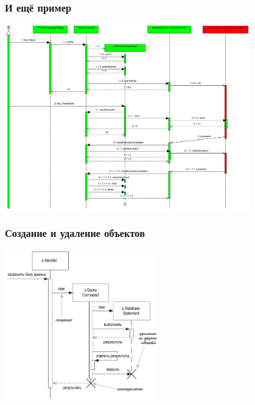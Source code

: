 \documentclass{../../slides-style}
\begin{document}
    \begin{frame}
        \frametitle{И ещё пример}
        \begin{center}
            \includegraphics[width=0.8\textwidth]{sequenceDiagramExample3.png}
        \end{center}
    \end{frame}

    \begin{frame}
        \frametitle{Создание и удаление объектов}
        \begin{center}
            \includegraphics[width=0.5\textwidth]{sequenceDiagramCreationAndDeletion.png}
        \end{center}
    \end{frame}
\end{document}
